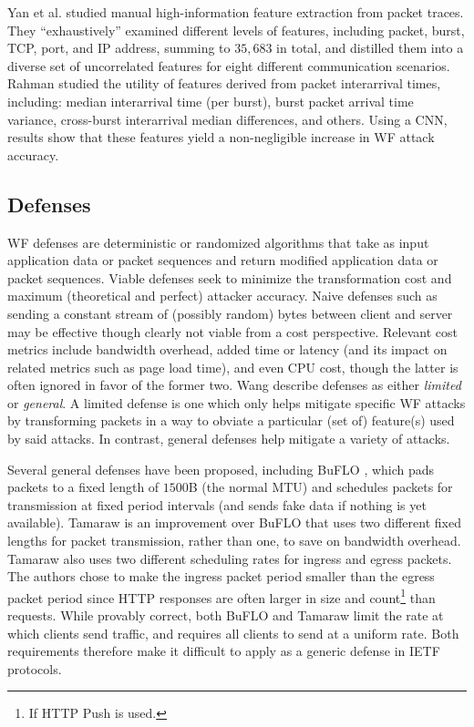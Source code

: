 \documentclass[runningheads]{llncs}
\begin{document}
Yan et al. \cite{yan2018feature} studied manual high-information feature extraction from packet traces.
They ``exhaustively'' examined different levels of features, including packet, burst, TCP, port, and IP address,
summing to $35,683$ in total, and distilled them into a diverse set of uncorrelated features for eight
different communication scenarios. Rahman \cite{rahman2018using} studied the utility of features derived
from packet interarrival times, including: median interarrival time (per burst), burst packet arrival
time variance, cross-burst interarrival median differences, and others. Using a CNN, results show that
these features yield a non-negligible increase in WF attack accuracy.

\subsection{Defenses} \label{sec:defenses}
WF defenses are deterministic or randomized algorithms that take as input application data or packet sequences
and return modified application data or packet sequences. Viable defenses seek to minimize the transformation
cost and maximum (theoretical and perfect) attacker accuracy. Naive defenses such as sending a constant stream
of (possibly random) bytes between client and server may be effective though clearly not viable from a cost
perspective. Relevant cost metrics include bandwidth overhead, added time or latency (and its impact on related
metrics such as page load time), and even CPU cost, though the latter is often ignored in favor of the former two.
Wang \cite{wang2016website} describe defenses as either \emph{limited} or \emph{general}. A limited defense is
one which only helps mitigate specific WF attacks by transforming packets in a way to obviate a particular
(set of) feature(s) used by said attacks. In contrast, general defenses help mitigate a variety of attacks.

Several general defenses have been proposed, including BuFLO \cite{dyer2012peek}, which pads packets to
a fixed length of $1500$B (the normal MTU) and schedules packets for transmission at fixed period intervals
(and sends fake data if nothing is yet available). Tamaraw \cite{wang2016website} is an improvement over BuFLO
that uses two different fixed lengths for packet transmission, rather than one, to save on bandwidth overhead.
Tamaraw also uses two different scheduling rates for ingress and egress packets. The authors chose to make
the ingress packet period smaller than the egress packet period since HTTP responses are often larger in size
and count\footnote{If HTTP Push is used.} than requests. While provably correct, both BuFLO and Tamaraw limit
the rate at which clients send traffic, and requires all clients to send at a uniform rate. Both requirements
therefore make it difficult to apply as a generic defense in IETF protocols.
\end{document}

